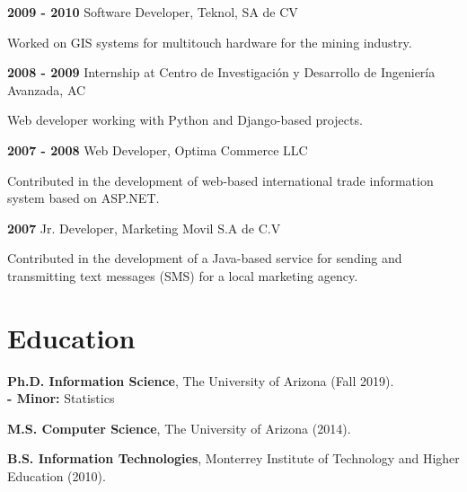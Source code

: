 \documentclass[letterpaper]{article}
\renewenvironment{itemize}{
  \begin{list}{}{
    \setlength{\leftmargin}{1.5em}
  }
}{
  \end{list}
}
\begin{document}
\begin{itemize}
\begin{itemize}
\end{itemize}
\item \textbf{2009 - 2010} Software Developer, Teknol, SA de CV
\item \begin{itemize}
\item Worked on GIS systems for multitouch hardware for the mining industry.
\end{itemize}
\item \textbf{2008 - 2009} Internship at {\small Centro de Investigaci\'{o}n y Desarrollo de Ingenier\'{i}a Avanzada, AC}
\item \begin{itemize}
\item Web developer working with Python and Django-based projects.
\end{itemize}
\item \textbf{2007 - 2008} Web Developer, Optima Commerce LLC
\item \begin{itemize}
\item Contributed in the development of web-based international trade information system based on ASP.NET.
\end{itemize}
\item \textbf{2007} Jr. Developer, Marketing Movil S.A de C.V
\item \begin{itemize}
\item Contributed in the development of a Java-based service for sending and transmitting text messages (SMS) for a local marketing agency.
\end{itemize}
\end{itemize}

\section*{Education}

\begin{itemize}
  \item \textbf{Ph.D. Information Science}, The University of Arizona (Fall 2019). \\
     \textbf{- Minor:} Statistics
  \item \textbf{M.S. Computer Science}, The University of Arizona (2014).
  \item \textbf{B.S. Information Technologies}, Monterrey Institute of Technology and Higher Education (2010).
\end{itemize}
\end{document}
